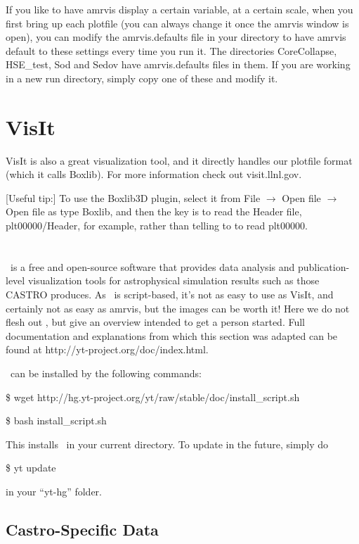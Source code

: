 If you like to have amrvis display a certain variable, at a certain
scale, when you first bring up each plotfile (you can always change it
once the amrvis window is open), you can modify the amrvis.defaults
file in your directory to have amrvis default to these settings every
time you run it. The directories CoreCollapse, HSE\_test, Sod and
Sedov have amrvis.defaults files in them. If you are working in a new
run directory, simply copy one of these and modify it.


\section{VisIt}
VisIt is also a great visualization tool, and it directly handles our
plotfile format (which it calls Boxlib).  For more information check
out visit.llnl.gov.

[Useful tip:] To use the Boxlib3D plugin, select it from File
$\rightarrow$ Open file $\rightarrow$ Open file as type Boxlib, and
then the key is to read the Header file, plt00000/Header, for example,
rather than telling to to read plt00000.

\section{\yt}
\yt\ is a free and open-source software that provides data analysis and
publication-level visualization tools for astrophysical simulation
results such as those CASTRO produces. As \yt\ is script-based, it's not
as easy to use as VisIt, and certainly not as easy as amrvis, but the
images can be worth it! Here we do not flesh out \yt, but give an
overview intended to get a person started. Full documentation and
explanations from which this section was adapted can be found at
http://yt-project.org/doc/index.html.

\yt\ can be installed by the following commands:

\$ wget http://hg.yt-project.org/yt/raw/stable/doc/install\_script.sh

\$ bash install\_script.sh

This installs \yt\ in your current directory. To update \yt in the
future, simply do

\$ yt update

in your ``yt-hg'' folder.

\subsection{Castro-Specific Data}

